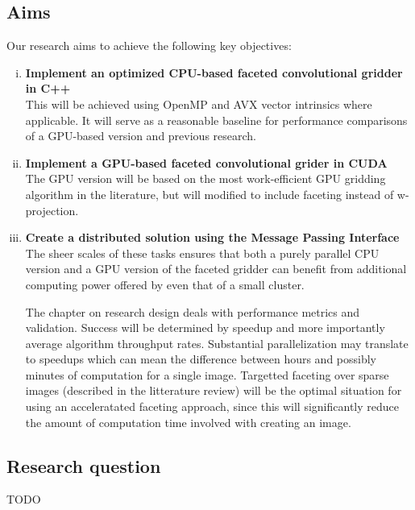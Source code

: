 \documentclass[a4paper, two column]{article}
\begin{document}
\subsection{Aims}
Our research aims to achieve the following key objectives:
\begin{enumerate}[i)]
 \item \textbf{Implement an optimized CPU-based faceted convolutional gridder in C++}\\
  This will be achieved using OpenMP and AVX vector intrinsics where applicable. It will serve as a reasonable baseline for performance comparisons of a GPU-based version and previous research.
 \item \textbf{Implement a GPU-based faceted convolutional grider in CUDA}\\
  The GPU version will be based on the most work-efficient GPU gridding algorithm in the literature, but will modified to include faceting instead of w-projection.
 \item \textbf{Create a distributed solution using the Message Passing Interface}\\
  The sheer scales of these tasks ensures that both a purely parallel CPU version and a GPU version of the faceted gridder can benefit from additional computing power offered by even that of a small cluster.
  
The chapter on research design deals with performance metrics and validation. Success will be determined by speedup and more importantly average algorithm throughput rates. Substantial parallelization 
may translate to speedups which can mean the difference between hours and possibly minutes of computation for a single image. Targetted faceting over sparse images (described in the litterature review) will
be the optimal situation for using an acceleratated faceting approach, since this will significantly reduce the amount of computation time involved with creating an image.
\end{enumerate}
\subsection{Research question}
 {\color{red}TODO}
\end{document}
